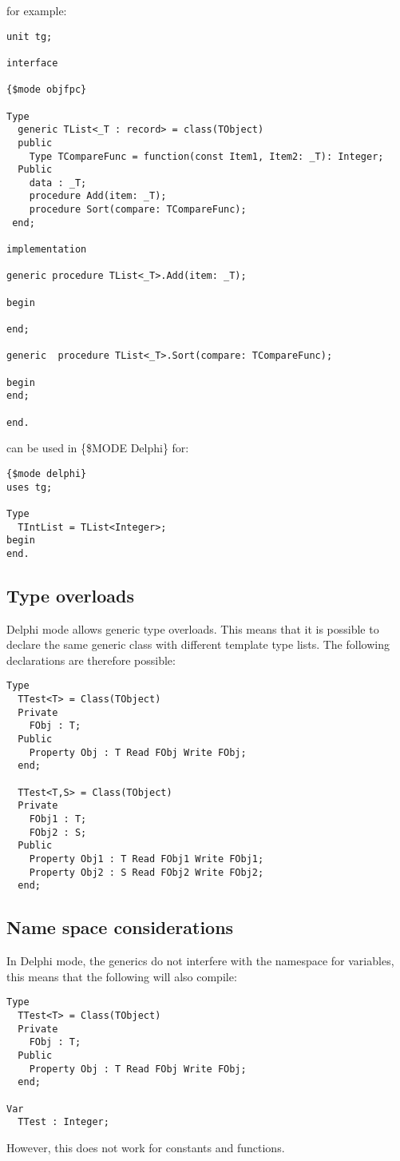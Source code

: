 for example:
\begin{verbatim}
unit tg;

interface

{$mode objfpc}

Type
  generic TList<_T : record> = class(TObject)
  public
    Type TCompareFunc = function(const Item1, Item2: _T): Integer;
  Public
    data : _T;
    procedure Add(item: _T);
    procedure Sort(compare: TCompareFunc);
 end;

implementation

generic procedure TList<_T>.Add(item: _T);

begin

end;

generic  procedure TList<_T>.Sort(compare: TCompareFunc);

begin
end;

end.
\end{verbatim}
can be used in \{\$MODE Delphi\} for:
\begin{verbatim}
{$mode delphi}
uses tg;

Type
  TIntList = TList<Integer>;
begin
end.
\end{verbatim}


\subsection{Type overloads}
Delphi mode allows generic type overloads. This means that it is possible to declare the same generic class
with different template type lists. The following declarations are therefore possible:
\begin{verbatim}
Type
  TTest<T> = Class(TObject)
  Private
    FObj : T;
  Public
    Property Obj : T Read FObj Write FObj;
  end;

  TTest<T,S> = Class(TObject)
  Private
    FObj1 : T;
    FObj2 : S;
  Public
    Property Obj1 : T Read FObj1 Write FObj1;
    Property Obj2 : S Read FObj2 Write FObj2;
  end;
\end{verbatim}

\subsection{Name space considerations}
In Delphi mode, the generics do not interfere with the namespace for variables, this means that the following will also compile:
\begin{verbatim}
Type
  TTest<T> = Class(TObject)
  Private
    FObj : T;
  Public
    Property Obj : T Read FObj Write FObj;
  end;

Var
  TTest : Integer;
\end{verbatim}
However, this does not work for constants and functions.


